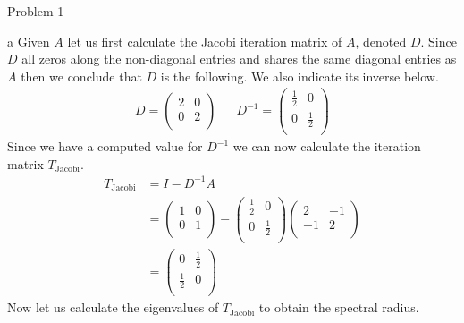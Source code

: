 \begin{section}{Problem 1}
    \begin{solution}{a}
        Given $A$ let us first calculate the Jacobi iteration matrix of $A$, denoted $D$. Since $D$ all zeros along the non-diagonal entries and shares the same diagonal entries as $A$ then we conclude that $D$ is the following. We also indicate its inverse below.
        \begin{align*}
            D = \begin{pmatrix}
                2 & 0 \\
                0 & 2 \\
            \end{pmatrix} & &
            D^{-1} = \begin{pmatrix}
                \frac{1}{2} & 0 \\
                0 & \frac{1}{2} \\
            \end{pmatrix}
        \end{align*}
        Since we have a computed value for $D^{-1}$ we can now calculate the iteration matrix $T_\text{Jacobi}$.
        \begin{align*}
            T_\text{Jacobi} &= I - D^{-1} A \\
            &= \begin{pmatrix}
                1 & 0 \\
                0 & 1 \\
            \end{pmatrix}
            - \begin{pmatrix}
                \frac{1}{2} & 0 \\
                0 & \frac{1}{2} \\
            \end{pmatrix}
            \begin{pmatrix}
                2 & -1 \\
                -1 & 2 \\        
            \end{pmatrix} \\
            &= \begin{pmatrix}
                0 & \frac{1}{2} \\
                \frac{1}{2} & 0 \\
            \end{pmatrix}
        \end{align*}
        \continued
        Now let us calculate the eigenvalues of $T_\text{Jacobi}$ to obtain the spectral radius.

\end{solution}
\end{section}
